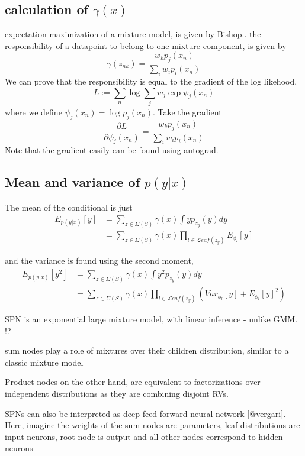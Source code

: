\subsection*{calculation of $\gamma(x)$}
expectation maximization of a mixture model, is given by Bishop..
the responsibility of a datapoint to belong to one mixture component, is given by
$$\gamma(z_{nk}) = \frac{w_k p_j(x_n)}{\sum_i w_i p_i(x_n)}$$
We can prove that the responsibility is equal to the gradient of the log likehood, 
$$L:= \sum_n \log \sum_j w_j \exp \psi_j(x_n)$$
where we define $\psi_j(x_n) = \log p_j(x_n)$. Take the gradient 
$$\frac{\partial L}{\partial \psi_{j}(x_{n})} = \frac{w_k p_j(x_n)}{\sum_i w_i p_i(x_n)}$$
Note that the gradient easily can be found using autograd. 


\subsection*{Mean and variance of $p(y|x)$}

The mean of the conditional is just
\begin{align*}
    E_{p(y|x)}[y] &= \sum_{z \in \Sigma(S)} \gamma(x) \int  y p_{z_y}(y) dy \\
    &= \sum_{z \in \Sigma(S)} \gamma(x) \prod_{l \in \mathcal{L}eaf(z_y)} E_{\phi_l}[y]
\end{align*}

and the variance is found using the second moment, 
\begin{align*}
    E_{p(y|x)}[y^2] &= \sum_{z \in \Sigma(S)} \gamma(x) \int  y^2 p_{z_y}(y) dy \\
    &= \sum_{z \in \Sigma(S)} \gamma(x) \prod_{l \in \mathcal{L}eaf(z_y)} (Var_{\phi_l}[y]+E_{\phi_l}[y]^2)
\end{align*}



SPN is an exponential large mixture model, with linear inference - unlike GMM. !?

sum nodes play a role of
mixtures over their children distribution, similar to a classic mixture model

Product
nodes on the other hand, are equivalent to factorizations over independent distributions as they are
combining disjoint RVs.

SPNs can also be interpreted as deep feed forward neural network [@vergari]. Here, imagine the
weights of the sum nodes are parameters, leaf distributions are input neurons, root node is output and
all other nodes correspond to hidden neurons


